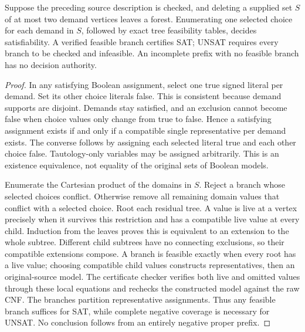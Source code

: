 \begin{samepage}
\begin{proposition}
Suppose the preceding source description is checked, and deleting a supplied
set $S$ of at most two demand vertices leaves a forest. Enumerating one selected
choice for each demand in $S$, followed by exact tree feasibility tables, decides
satisfiability. A verified feasible branch certifies SAT; UNSAT requires every
branch to be checked and infeasible. An incomplete prefix with no feasible branch
has no decision authority.
\end{proposition}
\end{samepage}
\begin{proof}
In any satisfying Boolean assignment, select one true signed literal per demand.
Set its other choice literals false. This is consistent because demand supports
are disjoint. Demands stay satisfied, and an exclusion cannot become false when
choice values only change from true to false. Hence a satisfying assignment
exists if and only if a compatible single representative per demand exists.
The converse follows by assigning each selected literal true and each other
choice false. Tautology-only variables may be assigned arbitrarily. This is an
existence equivalence, not equality of the original sets of Boolean models.

Enumerate the Cartesian product of the domains in $S$. Reject a branch whose
selected choices conflict. Otherwise remove all remaining domain values that
conflict with a selected choice. Root each residual tree. A value is live at a
vertex precisely when it survives this restriction and has a compatible live
value at every child. Induction from the leaves proves this is equivalent to an
extension to the whole subtree. Different child subtrees have no connecting
exclusions, so their compatible extensions compose. A branch is feasible exactly
when every root has a live value; choosing compatible child values constructs
representatives, then an original-source model. The certificate checker verifies
both live and omitted values through these local equations and rechecks the
constructed model against the raw CNF. The branches partition representative
assignments. Thus any feasible branch suffices for SAT, while complete negative
coverage is necessary for UNSAT. No conclusion follows from an entirely negative
proper prefix.
\end{proof}


